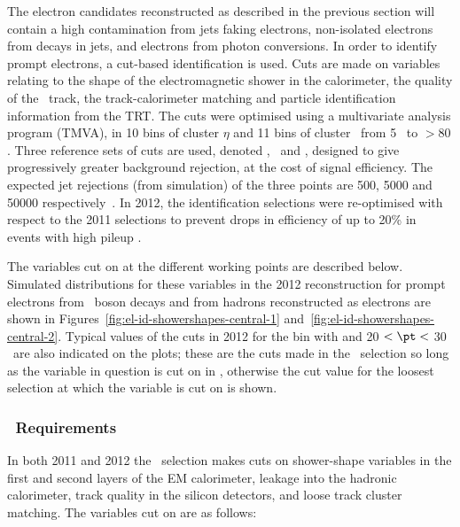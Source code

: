 The electron candidates reconstructed as described in the previous section will
contain a high contamination from jets faking electrons, non-isolated electrons
from decays in jets, and electrons from photon conversions. In order to identify
prompt electrons, a cut-based identification is used. Cuts are made on variables
relating to the shape of the electromagnetic shower in the calorimeter, the
quality of the \id\ track, the track-calorimeter matching and particle
identification information from the TRT. The cuts were optimised using a
multivariate analysis program (TMVA), in 10 bins of cluster $\eta$ and 11 bins
of cluster \et\ from 5 \gev\ to $>80$ \gev.  Three reference sets of cuts are
used, denoted \loosePP, \mediumPP\ and \tightPP, designed to give progressively
greater background rejection, at the cost of signal efficiency. The expected jet
rejections (from simulation) of the three points are 500, 5000 and 50000
respectively~\cite{ATL-PHYS-PUB-2011-006}. In 2012, the identification
selections were re-optimised with respect to the 2011 selections to prevent
drops in efficiency of up to 20\% in events with high pileup . 


The variables cut on at the different working points are described below.
Simulated distributions for these variables in the 2012 reconstruction for
prompt electrons from \Z\ boson decays and from hadrons reconstructed as
electrons are shown in Figures~\ref{fig:el-id-showershapes-central-1}
and~\ref{fig:el-id-showershapes-central-2}. Typical values of the cuts in 2012
for the bin with  and 20 \gev $< \pt <$ 30 \gev\ are
also indicated on the plots; these are the cuts made in the \loosePP\ selection
so long as the variable in question is cut on in \loosePP, otherwise the cut
value for the loosest selection at which the variable is cut on is shown.

\subsubsection{\loosePP\ Requirements}

In both 2011 and 2012 the \loosePP\ selection makes cuts on shower-shape
variables in the first and second layers of the EM calorimeter, leakage into the
hadronic calorimeter, track quality in the silicon detectors, and loose track
cluster matching. The variables cut on are as follows:


